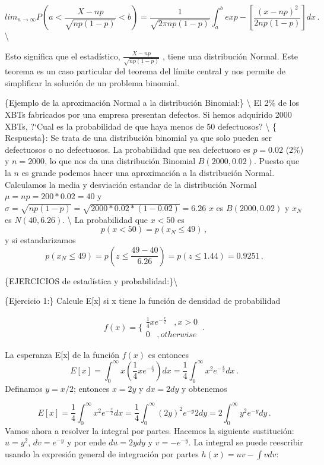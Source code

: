 \documentclass[
]{agujournal2019}
\begin{document}
\[lim_{n\rightarrow\infty} P \left( a<\frac{X-np}{\sqrt{np(1-p)}}<b\right)= \frac{1}{\sqrt{2\pi np(1-p)}}\int^b_a exp-\left[\frac{(x-np)^2}{2np(1-p)}\right]dx\,.\]\textbackslash{}

Esto significa que el estadístico, \(\frac{X-np}{\sqrt{np(1-p)}}\) ,
tiene una distribución Normal. Este teorema es un caso particular del
teorema del límite central y nos permite de simplificar la solución de
un problema binomial.

\vspace{0.5cm} \{\noindent  Ejemplo de la aproximación Normal a la
distribución Binomial:\} \textbackslash{} El 2\% de los XBTs fabricados
por una empresa presentan defectos. Si hemos adquirido 2000 XBTs,
?{}`Cual es la probabilidad de que haya menos de 50 defectuosos?
\textbackslash{} \{ Respuesta\}: Se trata de una distribución binomial
ya que solo pueden ser defectuosos o no defectuosos. La probabilidad que
sea defectuoso es \(p=0.02\) (2\%) y \(n=2000\), lo que nos da una
distribución Binomial \(B(2000,0.02)\). Puesto que la \(n\) es grande
podemos hacer una aproximación a la distribución Normal. Calculamos la
media y desviación estandar de la distribución Normal
\(\mu=np=200*0.02=40\) y
\(\sigma=\sqrt{np(1-p)}=\sqrt{2000*0.02*(1-0.02)}=6.26\) \(x\) es
\(B(2000,0.02)\) y \(x_N\) es \(N(40,6.26)\). \textbackslash{} La
probabilidad que \(x<50\) es \[p(x<50)=p(x_N\le 49)\,,\] y si
estandarizamos
\[p(x_N\le 49)=p\left(z\le \frac{49-40}{6.26} \right)=p(z\le 1.44)=0.9251\,.\]

\vspace{0.5cm}

\{\noindent  EJERCICIOS de estadística y probabilidad:\}\textbackslash{}

\vspace{0.5cm} \{\noindent  Ejercicio 1:\} Calcule E{[}x{]} si x tiene
la función de densidad de probabilidad

\[f(x)=\Bigg\{\begin{array}{c}
 \frac{1}{4}xe^{-\frac{x}{2}}\,\,\,\,\,,x>0 \\ 0 \,\,\,\,\,,otherwise
       \end{array} \,.\]

La esperanza E{[}x{]} de la función \(f(x)\) es entonces
\[E[x]=\int^\infty_0 x\left(\frac{1}{4}xe^{-\frac{x}{2}}\right)dx
      =\frac{1}{4}\int^\infty_0 x^2e^{-\frac{x}{2}}dx\,.\] Definamos
\(y=x/2\); entonces \(x=2y\) y \(dx=2dy\) y obtenemos

\[E[x]=\frac{1}{4}\int^\infty_0 x^2e^{-\frac{x}{2}}dx
        =\frac{1}{4}\int^\infty_0 (2y)^2e^{-y}2dy
    =2\int^\infty_0y^2e^{-y}dy\,.\] Vamos ahora a resolver la integral
por partes. Hacemos la siguiente sustitución: \(u=y^2\), \(dv=e^{-y}\) y
por ende \(du=2ydy\) y \(v=-e^{-y}\). La integral se puede reescribir
usando la expresión general de integración por partes
\(h(x)=uv-\int vdv\):
\end{document}
